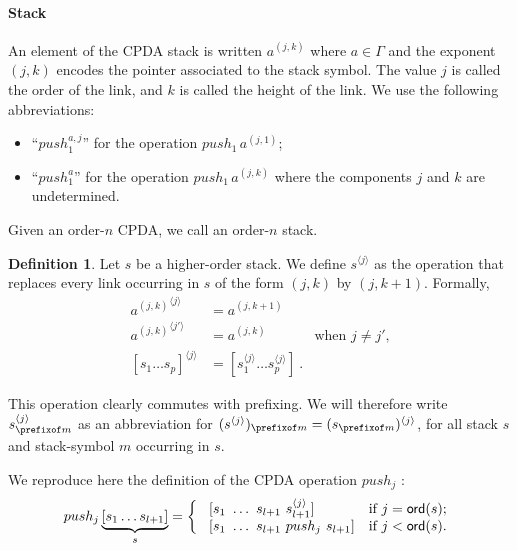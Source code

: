 \documentclass[a4paper,draft]{article}
\theoremstyle{remark}
\theoremstyle{definition}
\newtheorem{definition}{Definition}[section]
\begin{document}
\paragraph{Stack}
An element of the CPDA stack is written $a^{(j,k)}$ where $a\in \Gamma$ and the exponent $(j,k)$
encodes the pointer associated to the stack symbol. The value $j$ is called the order of the link, and $k$ is called the height of the link. 
We use the following abbreviations:
\begin{itemize}
\item ``$push_1^{a,j}$'' for the operation $push_1\,a^{(j,1)}$;
\item ``$push_1^a$'' for the operation $push_1\,a^{(j,k)}$ where the components $j$ and $k$ are undetermined.
\end{itemize}

Given an order-$n$ CPDA, we call  an order-$n$ stack.




\begin{definition}
Let $s$ be a higher-order stack. We define $s^{\langle j \rangle}$ as the operation that replaces
every link occurring in $s$ of the form $(j,k)$ by $(j,k+1)$. Formally,
\begin{align*}
{a^{(j,k)}}^{\langle j \rangle} &= a^{(j,k+1)}   \\
{a^{(j,k)}}^{\langle j' \rangle} &= a^{(j,k)} &   \mbox{when $j\neq j'$,}\\
[s_1 \ldots s_p]^{\langle j \rangle} &= [s_1^{\langle j \rangle} \ldots s_p^{\langle j \rangle}] \ .
\end{align*}
\end{definition}
This operation clearly commutes with prefixing. We will therefore write $s^{\langle j\rangle}_{\prefixof m}$ as an abbreviation for
$(s^{\langle j\rangle})_{\prefixof m} = (s_{\prefixof m})^{\langle j\rangle}$,
for all stack $s$ and stack-symbol $m$ occurring in $s$.


We reproduce here the definition of the CPDA operation $push_j$ \cite{hmos-lics08}:
$$ push_j \underbrace{[ s_1 \ldots s_{l+1} ]}_{s} =
\left\{
  \begin{array}{ll}
\    [s_1\ \ldots\ s_{l+1}\ s_{l+1}^{\langle j \rangle}]  &\hbox{if $j = {\sf ord}(s)$;}\\
\    [s_1\ \ldots\ s_{l+1}\ push_j\ s_{l+1}]  &\hbox{if $j<{\sf ord}(s)$.}
 \end{array}
\right.
$$
\end{document}

